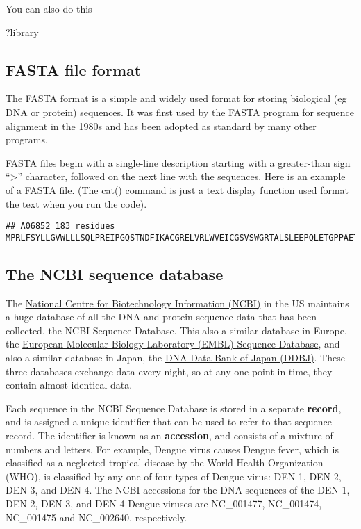 \documentclass[
]{book}
\newenvironment{Shaded}{\begin{snugshade}}{\end{snugshade}}
\newcommand{\NormalTok}[1]{#1}
\begin{document}
You can also do this

\begin{Shaded}
\begin{Highlighting}[]
\NormalTok{?library}
\end{Highlighting}
\end{Shaded}

\hypertarget{fasta-file-format}{%
\subsection{FASTA file format}\label{fasta-file-format}}

The FASTA format is a simple and widely used format for storing biological (eg DNA or protein) sequences. It was first used by the \href{https://en.wikipedia.org/wiki/FASTA}{FASTA program} for sequence alignment in the 1980s and has been adopted as standard by many other programs.

FASTA files begin with a single-line description starting with a greater-than sign ``\textgreater{}'' character, followed on the next line with the sequences. Here is an example of a FASTA file. (The cat() command is just a text display function used format the text when you run the code).

\begin{verbatim}
## A06852 183 residues MPRLFSYLLGVWLLLSQLPREIPGQSTNDFIKACGRELVRLWVEICGSVSWGRTALSLEEPQLETGPPAETMPSSITKDAEILKMMLEFVPNLPQELKATLSERQPSLRELQQSASKDSNLNFEEFKKIILNRQNEAEDKSLLELKNLGLDKHSRKKRLFRMTLSEKCCQVGCIRKDIARLC
\end{verbatim}

\hypertarget{the-ncbi-sequence-database}{%
\subsection{The NCBI sequence database}\label{the-ncbi-sequence-database}}

The \href{www.ncbi.nlm.nih.gov}{National Centre for Biotechnology Information (NCBI)} in the US maintains a huge database of all the DNA and protein sequence data that has been collected, the NCBI Sequence Database. This also a similar database in Europe, the \href{www.ebi.ac.uk/embl}{European Molecular Biology Laboratory (EMBL) Sequence Database}, and also a similar database in Japan, the \href{www.ddbj.nig.ac.jp}{DNA Data Bank of Japan (DDBJ)}. These three databases exchange data every night, so at any one point in time, they contain almost identical data.

Each sequence in the NCBI Sequence Database is stored in a separate \textbf{record}, and is assigned a unique identifier that can be used to refer to that sequence record. The identifier is known as an \textbf{accession}, and consists of a mixture of numbers and letters. For example, Dengue virus causes Dengue fever, which is classified as a neglected tropical disease by the World Health Organization (WHO), is classified by any one of four types of Dengue virus: DEN-1, DEN-2, DEN-3, and DEN-4. The NCBI accessions for the DNA sequences of the DEN-1, DEN-2, DEN-3, and DEN-4 Dengue viruses are NC\_001477, NC\_001474, NC\_001475 and NC\_002640, respectively.
\end{document}

